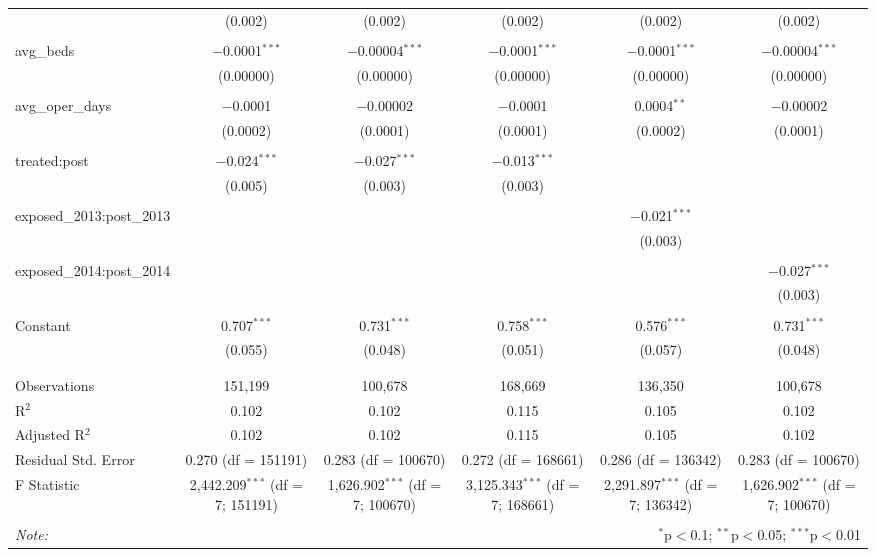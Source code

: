 \begin{table}[!htbp]
\begin{tabular}{@{\extracolsep{5pt}}lccccc}
  & (0.002) & (0.002) & (0.002) & (0.002) & (0.002) \\ 
  & & & & & \\ 
 avg\_beds & $-$0.0001$^{***}$ & $-$0.00004$^{***}$ & $-$0.0001$^{***}$ & $-$0.0001$^{***}$ & $-$0.00004$^{***}$ \\ 
  & (0.00000) & (0.00000) & (0.00000) & (0.00000) & (0.00000) \\ 
  & & & & & \\ 
 avg\_oper\_days & $-$0.0001 & $-$0.00002 & $-$0.0001 & 0.0004$^{**}$ & $-$0.00002 \\ 
  & (0.0002) & (0.0001) & (0.0001) & (0.0002) & (0.0001) \\ 
  & & & & & \\ 
 treated:post & $-$0.024$^{***}$ & $-$0.027$^{***}$ & $-$0.013$^{***}$ &  &  \\ 
  & (0.005) & (0.003) & (0.003) &  &  \\ 
  & & & & & \\ 
 exposed\_2013:post\_2013 &  &  &  & $-$0.021$^{***}$ &  \\ 
  &  &  &  & (0.003) &  \\ 
  & & & & & \\ 
 exposed\_2014:post\_2014 &  &  &  &  & $-$0.027$^{***}$ \\ 
  &  &  &  &  & (0.003) \\ 
  & & & & & \\ 
 Constant & 0.707$^{***}$ & 0.731$^{***}$ & 0.758$^{***}$ & 0.576$^{***}$ & 0.731$^{***}$ \\ 
  & (0.055) & (0.048) & (0.051) & (0.057) & (0.048) \\ 
  & & & & & \\ 
\hline \\[-1.8ex] 
Observations & 151,199 & 100,678 & 168,669 & 136,350 & 100,678 \\ 
R$^{2}$ & 0.102 & 0.102 & 0.115 & 0.105 & 0.102 \\ 
Adjusted R$^{2}$ & 0.102 & 0.102 & 0.115 & 0.105 & 0.102 \\ 
Residual Std. Error & 0.270 (df = 151191) & 0.283 (df = 100670) & 0.272 (df = 168661) & 0.286 (df = 136342) & 0.283 (df = 100670) \\ 
F Statistic & 2,442.209$^{***}$ (df = 7; 151191) & 1,626.902$^{***}$ (df = 7; 100670) & 3,125.343$^{***}$ (df = 7; 168661) & 2,291.897$^{***}$ (df = 7; 136342) & 1,626.902$^{***}$ (df = 7; 100670) \\ 
\hline 
\hline \\[-1.8ex] 
\textit{Note:}  & \multicolumn{5}{r}{$^{*}$p$<$0.1; $^{**}$p$<$0.05; $^{***}$p$<$0.01} \\ 
\end{tabular} 
\end{table} 
